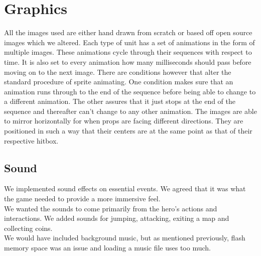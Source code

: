 \section{Graphics}%
All the images used are either hand drawn from scratch or based off open source images which we altered. Each type of unit has a set of animations in the form of multiple images. These animations cycle through their sequences with respect to time. It is also set to every animation how many milliseconds should pass before moving on to the next image. There are conditions however that alter the standard procedure of sprite animating. One condition makes sure that an animation runs through to the end of the sequence before being able to change to a different animation. The other assures that it just stops at the end of the sequence and thereafter can't change to any other animation. The images are able to mirror horizontally for when props are facing different directions. They are positioned in such a way that their centers are at the same point as that of their respective hitbox. 


\subsection*{Sound} %
We implemented sound effects on essential events. We agreed that it was what the game needed to provide a more immersive feel.\\
We wanted the sounds to come primarily from the hero's actions and interactions. We added sounds for jumping, attacking, exiting a map and collecting coins.\\
We would have included background music, but as mentioned previously, flash memory space was an issue and loading a music file uses too much.
